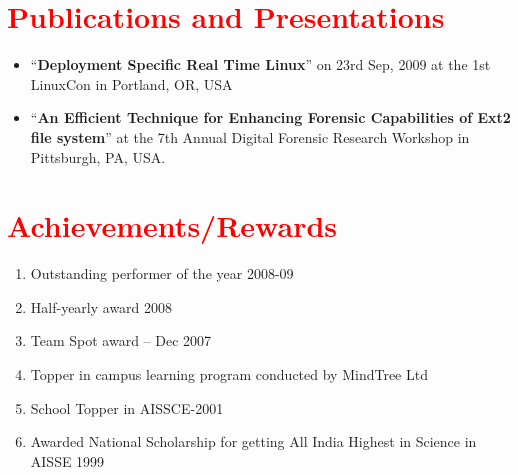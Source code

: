 \documentclass[letterpaper,11pt]{article}
\newcommand{\resumeSubHeadingListStart}{\begin{itemize}[leftmargin=*]}
\newcommand{\resumeSubHeadingListEnd}{\end{itemize}}
\begin{document}
\section{\textcolor{RED}{Publications and Presentations}}
  \resumeSubHeadingListStart
    \item {“\textbf{Deployment Specific Real Time Linux}” on 23rd Sep, 2009 at the 1st LinuxCon in Portland, OR, USA}
    \item  {“\textbf{An Efficient Technique for Enhancing Forensic Capabilities of Ext2 file system}” at the 7th Annual Digital Forensic Research Workshop in Pittsburgh, PA, USA.}
  \resumeSubHeadingListEnd
  
  

\section{\textcolor{RED}{Achievements/Rewards}}
  \begin{enumerate}
    \item {Outstanding performer of the year 2008-09}
    \item {Half-yearly award 2008}
    \item{Team Spot award – Dec 2007}
    \item{Topper in campus learning program conducted by MindTree Ltd}
    \item{School Topper in AISSCE-2001}
    \item{Awarded National Scholarship for getting All India Highest in Science in AISSE 1999}  
    \end{enumerate}


\end{document}

